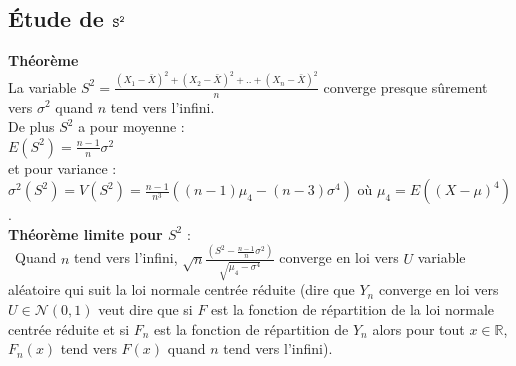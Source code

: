 \documentclass[a4paper,11pt]{book}
\begin{document}
\subsection{\'Etude de ${\tt S^2}$}
{\bf Th\'eor\`eme}\\
La variable  $\displaystyle S^2=\frac{(X_1-\bar X)^2+(X_2-\bar X)^2+..+(X_n-\bar X)^2}{n}$
 converge presque s\^urement vers $\sigma^2$ quand $n$ tend vers l'infini.\\
De plus $  S^2$ a pour  moyenne :\\
  $\displaystyle  E(S^2)=\frac{n-1}{n}\sigma^2$ \\
et pour variance :\\
$\displaystyle  \sigma^2(S^2)= V(S^2)=\frac{n-1}{n^3}((n-1)\mu_4-(n-3)\sigma^4)$ o\`u
$\mu_4=E((X-\mu)^4)$.\\

{\bf Th\'eor\`eme limite pour $S^2$} :\\\
Quand $n$ tend vers l'infini, $\displaystyle \sqrt n \frac{(S^2-\frac{n-1}{n}\sigma^2)}{\sqrt{\mu_4-\sigma^4}}$ converge en 
loi vers $U$ variable al\'eatoire qui suit la loi normale centr\'ee r\'eduite 
(dire que $Y_n$ converge en loi vers $U \in \mathcal N(0,1)$ veut dire que si 
$F$ est la fonction de r\'epartition de la loi normale centr\'ee r\'eduite et 
si $F_n$ est la fonction de r\'epartition de $Y_n$ alors pour tout $x\in \mathbb{R}$, $F_n(x)$ tend vers $F(x)$ quand $n$ tend vers l'infini).
\end{document}
